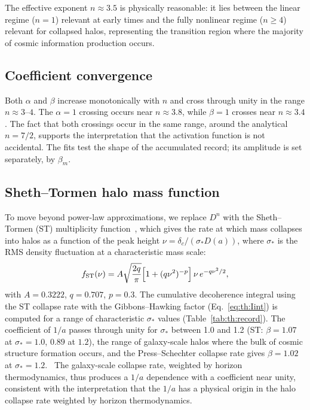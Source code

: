 The effective exponent $n\approx3.5$ is physically reasonable: it lies between the linear regime ($n=1$) relevant at early times and the fully
nonlinear regime ($n\ge4$) relevant for collapsed halos, representing the transition region where the majority of cosmic information production occurs.
\interp

\subsection{Coefficient convergence}
Both $\alpha$ and $\beta$ increase monotonically with $n$ and cross through unity in the range $n\approx3$--$4$. The $\alpha=1$ crossing occurs near
$n\approx3.8$, while $\beta=1$ crosses near $n\approx3.4$ \calc. The fact that both crossings occur in the same range, around the analytical $n=7/2$,
supports the interpretation that the activation function is not accidental. The fits test the shape of the accumulated record; its amplitude is set
separately, by $\beta_m$.

\subsection{Sheth--Tormen halo mass function}
To move beyond power-law approximations, we replace $D^n$ with the Sheth--Tormen (ST) multiplicity function~\cite{ShethTormen1999}, which gives the rate at which
mass collapses into halos as a function of the peak height $\nu=\delta_c/(\sigma_*D(a))$, where $\sigma_*$ is the RMS density fluctuation at a
characteristic mass scale:
\begin{equation}f_{\rm ST}(\nu)=A\sqrt{\frac{2q}{\pi}}\Big[1+(q\nu^2)^{-p}\Big]\,\nu\,e^{-q\nu^2/2},\label{eq:th:fST}\end{equation}
with $A=0.3222$, $q=0.707$, $p=0.3$. The cumulative decoherence integral using the ST collapse rate with the Gibbons--Hawking factor
(Eq.~\eqref{eq:th:Iint}) is computed for a range of characteristic $\sigma_*$ values (Table~\ref{tab:th:record}). The coefficient of $1/a$ passes through unity for
$\sigma_*$ between 1.0 and 1.2 (ST: $\beta=1.07$ at $\sigma_*=1.0$, $0.89$ at $1.2$), the range of galaxy-scale halos where the bulk of cosmic structure
formation occurs, and the Press--Schechter collapse rate gives $\beta=1.02$ at $\sigma_*=1.2$. \calc\ The galaxy-scale collapse rate, weighted by
horizon thermodynamics, thus produces a $1/a$ dependence with a coefficient near unity, consistent with the interpretation that the $1/a$ has a
physical origin in the halo collapse rate weighted by horizon thermodynamics.

